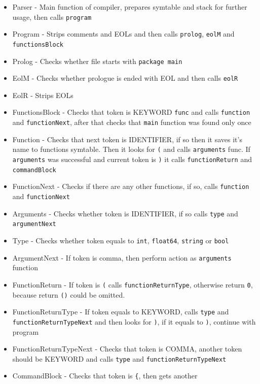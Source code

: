 \documentclass[11pt, titlepage]{article}
\begin{document}
\begin{itemize}[itemsep=-5pt]
\item
  Parser - Main function of compiler, prepares symtable and stack for
  further usage, then calls \texttt{program}
\item
  Program - Strips comments and EOLs and then calls \texttt{prolog},
  \texttt{eolM} and \texttt{functionsBlock}
\item
  Prolog - Checks whether file starts with \texttt{package\ main}
\item
  EolM - Checks whether prologue is ended with EOL and then calls
  \texttt{eolR}
\item
  EolR - Strips EOLs
\item
  FunctionsBlock - Checks that token is KEYWORD \texttt{func} and calls
  \texttt{function} and \texttt{functionNext}, after that checks that
  \texttt{main} function was found only once
\item
  Function - Checks that next token is IDENTIFIER, if so then it saves
  it's name to functions symtable. Then it looks for \texttt{(} and
  calls \texttt{arguments} func. If \texttt{arguments} was successful
  and current token is \texttt{)} it calls \texttt{functionReturn} and
  \texttt{commandBlock}
\item
  FunctionNext - Checks if there are any other functions, if so, calls
  \texttt{function} and \texttt{functionNext}
\item
  Arguments - Checks whether token is IDENTIFIER, if so calls
  \texttt{type} and \texttt{argumentNext}
\item
  Type - Checks whether token equals to \texttt{int}, \texttt{float64},
  \texttt{string} or \texttt{bool}
\item
  ArgumentNext - If token is comma, then perform action as
  \texttt{arguments} function
\item
  FunctionReturn - If token is \texttt{(} calls
  \texttt{functionReturnType}, otherwise return \texttt{0}, because
  return \texttt{()} could be omitted.
\item
  FunctionReturnType - If token equals to KEYWORD, calls \texttt{type}
  and \texttt{functionReturnTypeNext} and then looks for \texttt{)}, if
  it equals to \texttt{)}, continue with program
\item
  FunctionReturnTypeNext - Checks that token is COMMA, another token
  should be KEYWORD and calls \texttt{type} and
  \texttt{functionReturnTypeNext}
\item
  CommandBlock - Checks that token is \texttt{\{}, then gets another

\end{itemize}
\end{document}
